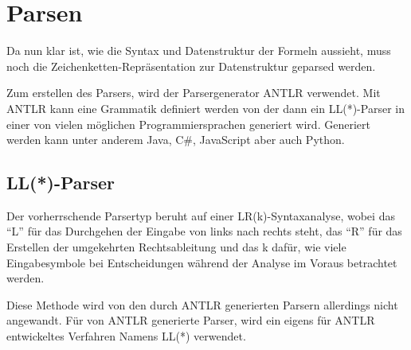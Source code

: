 \section{Parsen}
Da nun klar ist, wie die Syntax und Datenstruktur der Formeln aussieht, muss noch die Zeichenketten-Repräsentation zur Datenstruktur geparsed werden.

Zum erstellen des Parsers, wird der Parsergenerator ANTLR verwendet. Mit ANTLR kann eine Grammatik definiert werden von der dann ein LL(*)-Parser in einer von vielen möglichen Programmiersprachen generiert wird. Generiert werden kann unter anderem Java, C\#, JavaScript aber auch Python. \cite{antlr_doc}

\subsection{LL(*)-Parser}
Der vorherrschende Parsertyp beruht auf einer LR(k)-Syntaxanalyse, wobei das ``L'' für das Durchgehen der Eingabe von links nach rechts steht, das ``R'' für das Erstellen der umgekehrten Rechtsableitung und das k dafür, wie viele Eingabesymbole bei Entscheidungen während der Analyse im Voraus betrachtet werden. \cite{compiler_dragon_book}

Diese Methode wird von den durch ANTLR generierten Parsern allerdings nicht angewandt. Für von ANTLR generierte Parser, wird ein eigens für ANTLR entwickeltes Verfahren Namens LL(*) verwendet. \cite{ll_star_parser}







